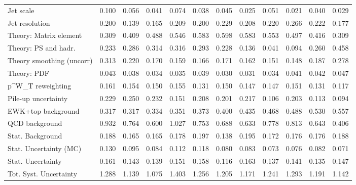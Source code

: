 \begin{tabular}{l|p{0.6cm}p{0.6cm}p{0.6cm}p{0.6cm}p{0.6cm}p{0.6cm}p{0.6cm}p{0.6cm}p{0.6cm}p{0.6cm}p{0.6cm}}
Jet scale                                & 0.100 & 0.056 & 0.041 & 0.074 & 0.038 & 0.045 & 0.025 & 0.051 & 0.021 & 0.040 & 0.029 \\
Jet resolution                           & 0.200 & 0.139 & 0.165 & 0.209 & 0.200 & 0.229 & 0.208 & 0.220 & 0.266 & 0.222 & 0.177 \\
Theory: Matrix element                   & 0.309 & 0.409 & 0.488 & 0.546 & 0.583 & 0.598 & 0.583 & 0.553 & 0.497 & 0.416 & 0.309 \\
Theory: PS and hadr.                     & 0.233 & 0.286 & 0.314 & 0.316 & 0.293 & 0.228 & 0.136 & 0.041 & 0.094 & 0.260 & 0.458 \\
Theory smoothing (uncorr)                & 0.313 & 0.220 & 0.170 & 0.159 & 0.166 & 0.171 & 0.162 & 0.151 & 0.148 & 0.187 & 0.278 \\
Theory: PDF                              & 0.043 & 0.038 & 0.034 & 0.035 & 0.039 & 0.030 & 0.031 & 0.034 & 0.041 & 0.042 & 0.047 \\
p^{W}_{T} reweighting                    & 0.161 & 0.154 & 0.150 & 0.155 & 0.131 & 0.150 & 0.147 & 0.147 & 0.151 & 0.131 & 0.117 \\
Pile-up uncertainty                      & 0.229 & 0.250 & 0.232 & 0.151 & 0.208 & 0.201 & 0.217 & 0.106 & 0.203 & 0.113 & 0.094 \\
EWK+top background                       & 0.317 & 0.317 & 0.334 & 0.351 & 0.373 & 0.400 & 0.435 & 0.468 & 0.488 & 0.530 & 0.557 \\
QCD background                           & 0.932 & 0.764 & 0.600 & 1.027 & 0.753 & 0.688 & 0.633 & 0.778 & 0.813 & 0.643 & 0.406 \\
Stat. Background                         & 0.188 & 0.165 & 0.165 & 0.178 & 0.197 & 0.138 & 0.195 & 0.172 & 0.176 & 0.176 & 0.188 \\
Stat. Uncertainty (MC)                   & 0.130 & 0.095 & 0.084 & 0.112 & 0.118 & 0.080 & 0.083 & 0.073 & 0.076 & 0.082 & 0.071 \\
\hline
Stat. Uncertainty                        & 0.161 & 0.143 & 0.139 & 0.151 & 0.158 & 0.116 & 0.163 & 0.137 & 0.141 & 0.135 & 0.147 \\
\hline
Tot. Syst. Uncertainty                   & 1.288 & 1.139 & 1.075 & 1.403 & 1.256 & 1.205 & 1.171 & 1.241 & 1.293 & 1.191 & 1.142 \\
\hline
\end{tabular}

